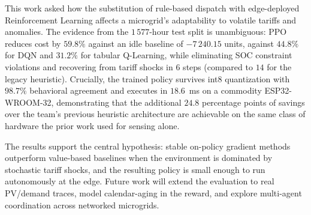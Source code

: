 \documentclass[conference]{IEEEtran}
\begin{document}
This work asked how the substitution of rule-based dispatch with edge-deployed Reinforcement Learning affects a microgrid's adaptability to volatile tariffs and anomalies. The evidence from the $1\,577$-hour test split is unambiguous: PPO reduces cost by $59.8\%$ against an idle baseline of $-7\,240.15$ units, against $44.8\%$ for DQN and $31.2\%$ for tabular Q-Learning, while eliminating SOC constraint violations and recovering from tariff shocks in $6$ steps (compared to $14$ for the legacy heuristic). Crucially, the trained policy survives int8 quantization with $98.7\%$ behavioral agreement and executes in $18.6$~ms on a commodity ESP32-WROOM-32, demonstrating that the additional $24.8$ percentage points of savings over the team's previous heuristic architecture are achievable on the same class of hardware the prior work used for sensing alone.

The results support the central hypothesis: stable on-policy gradient methods outperform value-based baselines when the environment is dominated by stochastic tariff shocks, and the resulting policy is small enough to run autonomously at the edge. Future work will extend the evaluation to real PV/demand traces, model calendar-aging in the reward, and explore multi-agent coordination across networked microgrids.



\end{document}
